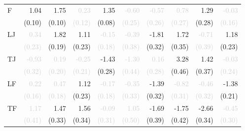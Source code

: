 \begin{tabular}{lrrrrrrrrr}
\multirow{2}{*}{F} &1.04 &1.75 &\textcolor{LightGray}{0.23} &\cellcolor{Gray}1.35 &\textcolor{LightGray}{-0.60} &\textcolor{LightGray}{-0.57} &\textcolor{LightGray}{0.78} &1.29 &\textcolor{LightGray}{-0.03}\\
 &\tiny{(0.10)} &\tiny{(0.10)} &\textcolor{LightGray}{\tiny{(0.12)}} &\cellcolor{Gray}\tiny{(0.08)} &\textcolor{LightGray}{\tiny{(0.25)}} &\textcolor{LightGray}{\tiny{(0.26)}} &\textcolor{LightGray}{\tiny{(0.27)}} &\tiny{(0.28)} &\textcolor{LightGray}{\tiny{(0.16)}}\\[1ex]
\multirow{2}{*}{LJ} &\textcolor{LightGray}{0.34} &1.82 &1.11 &\textcolor{LightGray}{-0.15} &\cellcolor{Gray}\textcolor{LightGray}{-0.39} &-1.81 &1.72 &\textcolor{LightGray}{-0.71} &1.18\\
 &\textcolor{LightGray}{\tiny{(0.23)}} &\tiny{(0.19)} &\tiny{(0.23)} &\textcolor{LightGray}{\tiny{(0.18)}} &\cellcolor{Gray}\textcolor{LightGray}{\tiny{(0.38)}} &\tiny{(0.32)} &\tiny{(0.35)} &\textcolor{LightGray}{\tiny{(0.39)}} &\tiny{(0.23)}\\[1ex]
\multirow{2}{*}{TJ} &\textcolor{LightGray}{-0.93} &\textcolor{LightGray}{0.19} &\textcolor{LightGray}{-0.25} &-1.43 &\textcolor{LightGray}{-1.30} &\cellcolor{Gray}\textcolor{LightGray}{0.16} &3.28 &1.42 &\textcolor{LightGray}{-0.03}\\
 &\textcolor{LightGray}{\tiny{(0.32)}} &\textcolor{LightGray}{\tiny{(0.20)}} &\textcolor{LightGray}{\tiny{(0.21)}} &\tiny{(0.28)} &\textcolor{LightGray}{\tiny{(0.44)}} &\cellcolor{Gray}\textcolor{LightGray}{\tiny{(0.28)}} &\tiny{(0.46)} &\tiny{(0.37)} &\textcolor{LightGray}{\tiny{(0.24)}}\\[1ex]
\multirow{2}{*}{LF} &\textcolor{LightGray}{0.22} &\textcolor{LightGray}{0.47} &1.12 &\textcolor{LightGray}{-0.17} &\textcolor{LightGray}{-0.35} &-1.39 &\cellcolor{Gray}\textcolor{LightGray}{-0.82} &\textcolor{LightGray}{-0.46} &-1.38\\
 &\textcolor{LightGray}{\tiny{(0.16)}} &\textcolor{LightGray}{\tiny{(0.18)}} &\tiny{(0.23)} &\textcolor{LightGray}{\tiny{(0.18)}} &\textcolor{LightGray}{\tiny{(0.33)}} &\tiny{(0.32)} &\cellcolor{Gray}\textcolor{LightGray}{\tiny{(0.31)}} &\textcolor{LightGray}{\tiny{(0.32)}} &\tiny{(0.21)}\\[1ex]
\multirow{2}{*}{TF} &\textcolor{LightGray}{1.17} &1.47 &1.56 &\textcolor{LightGray}{-0.09} &\textcolor{LightGray}{1.05} &-1.69 &-1.75 &\cellcolor{Gray}-2.66 &\textcolor{LightGray}{-0.45}\\
 &\textcolor{LightGray}{\tiny{(0.41)}} &\tiny{(0.33)} &\tiny{(0.34)} &\textcolor{LightGray}{\tiny{(0.31)}} &\textcolor{LightGray}{\tiny{(0.50)}} &\tiny{(0.39)} &\tiny{(0.42)} &\cellcolor{Gray}\tiny{(0.34)} &\textcolor{LightGray}{\tiny{(0.30)}}\\[1ex]

\end{tabular}
